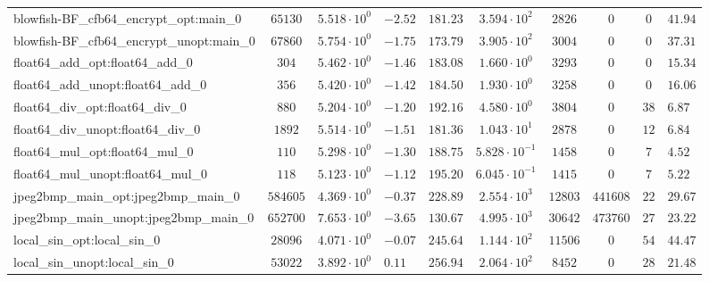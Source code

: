 \begin{tabular}{|l|c|HHc|c|c|c|cH|}
blowfish-BF\_cfb64\_encrypt\_opt:main\_0        & $ 65130    $ & $ 5.518 \cdot 10^{0} $ & $ -2.52 $ & $ 181.23 $ & $ 3.594 \cdot 10^{2}  $ & $ 2826   $ & $ 0       $ & $ 0   $ & $ 41.94   $ \\
blowfish-BF\_cfb64\_encrypt\_unopt:main\_0      & $ 67860    $ & $ 5.754 \cdot 10^{0} $ & $ -1.75 $ & $ 173.79 $ & $ 3.905 \cdot 10^{2}  $ & $ 3004   $ & $ 0       $ & $ 0   $ & $ 37.31   $ \\
float64\_add\_opt:float64\_add\_0               & $ 304      $ & $ 5.462 \cdot 10^{0} $ & $ -1.46 $ & $ 183.08 $ & $ 1.660 \cdot 10^{0}  $ & $ 3293   $ & $ 0       $ & $ 0   $ & $ 15.34   $ \\
float64\_add\_unopt:float64\_add\_0             & $ 356      $ & $ 5.420 \cdot 10^{0} $ & $ -1.42 $ & $ 184.50 $ & $ 1.930 \cdot 10^{0}  $ & $ 3258   $ & $ 0       $ & $ 0   $ & $ 16.06   $ \\
float64\_div\_opt:float64\_div\_0               & $ 880      $ & $ 5.204 \cdot 10^{0} $ & $ -1.20 $ & $ 192.16 $ & $ 4.580 \cdot 10^{0}  $ & $ 3804   $ & $ 0       $ & $ 38  $ & $ 6.87    $ \\
float64\_div\_unopt:float64\_div\_0             & $ 1892     $ & $ 5.514 \cdot 10^{0} $ & $ -1.51 $ & $ 181.36 $ & $ 1.043 \cdot 10^{1}  $ & $ 2878   $ & $ 0       $ & $ 12  $ & $ 6.84    $ \\
float64\_mul\_opt:float64\_mul\_0               & $ 110      $ & $ 5.298 \cdot 10^{0} $ & $ -1.30 $ & $ 188.75 $ & $ 5.828 \cdot 10^{-1} $ & $ 1458   $ & $ 0       $ & $ 7   $ & $ 4.52    $ \\
float64\_mul\_unopt:float64\_mul\_0             & $ 118      $ & $ 5.123 \cdot 10^{0} $ & $ -1.12 $ & $ 195.20 $ & $ 6.045 \cdot 10^{-1} $ & $ 1415   $ & $ 0       $ & $ 7   $ & $ 5.22    $ \\
jpeg2bmp\_main\_opt:jpeg2bmp\_main\_0           & $ 584605   $ & $ 4.369 \cdot 10^{0} $ & $ -0.37 $ & $ 228.89 $ & $ 2.554 \cdot 10^{3}  $ & $ 12803  $ & $ 441608  $ & $ 22  $ & $ 29.67   $ \\
jpeg2bmp\_main\_unopt:jpeg2bmp\_main\_0         & $ 652700   $ & $ 7.653 \cdot 10^{0} $ & $ -3.65 $ & $ 130.67 $ & $ 4.995 \cdot 10^{3}  $ & $ 30642  $ & $ 473760  $ & $ 27  $ & $ 23.22   $ \\
local\_sin\_opt:local\_sin\_0                   & $ 28096    $ & $ 4.071 \cdot 10^{0} $ & $ -0.07 $ & $ 245.64 $ & $ 1.144 \cdot 10^{2}  $ & $ 11506  $ & $ 0       $ & $ 54  $ & $ 44.47   $ \\
local\_sin\_unopt:local\_sin\_0                 & $ 53022    $ & $ 3.892 \cdot 10^{0} $ & $ 0.11  $ & $ 256.94 $ & $ 2.064 \cdot 10^{2}  $ & $ 8452   $ & $ 0       $ & $ 28  $ & $ 21.48   $ \\

\end{tabular}
